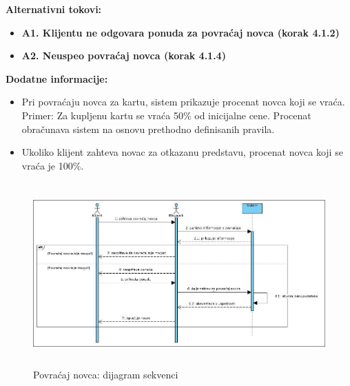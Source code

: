 \documentclass[a4paper]{article}
\begin{document}
  \noindent\textbf{Alternativni tokovi:} 
  \begin{itemize}
    \item \textbf{A1. Klijentu ne odgovara ponuda za povraćaj novca (korak 4.1.2)} 
    \item \textbf{A2. Neuspeo povraćaj novca (korak 4.1.4)} 
  \end{itemize}

  \noindent\textbf{Dodatne informacije:} 
  \begin{itemize}
    \item Pri povraćaju novca za kartu, sistem prikazuje procenat novca
  koji se vraća. Primer: Za kupljenu kartu se vraća 50\% od inicijalne cene. Procenat obračunava sistem
  na osnovu prethodno definisanih pravila.
    \item Ukoliko klijent zahteva novac za otkazanu predstavu, procenat novca koji se vraća je 100\%.
  \end{itemize}

  \begin{figure}[H]
    \begin{center}
        \includegraphics[width=120mm,height=70mm]{../images/sequence_povracaj_novca.jpg}
    \end{center}
    \caption{Povraćaj novca: dijagram sekvenci}
    \label{sequence_povracaj novca}
  \end{figure}
\end{document}
